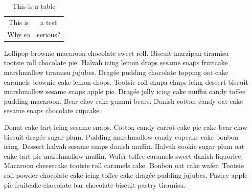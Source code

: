 \documentclass{article}
\begin{document}
\begin{table}[htb!]
    \centering
    \begin{tabular}{c|c}
        This is & a test \\
        Why so &  serious?
    \end{tabular}
    \caption{This is a table}
    \label{tab:my_label}
\end{table}

Lollipop brownie macaroon chocolate sweet roll. Biscuit marzipan tiramisu tootsie roll chocolate pie. Halvah icing lemon drops sesame snaps fruitcake marshmallow tiramisu jujubes. Dragée pudding chocolate topping oat cake caramels brownie cake lemon drops. Tootsie roll chupa chups icing dessert biscuit marshmallow sesame snaps apple pie. Dragée jelly icing cake muffin candy toffee pudding macaroon. Bear claw cake gummi bears. Danish cotton candy oat cake sesame snaps chocolate cupcake.

Donut cake tart icing sesame snaps. Cotton candy carrot cake pie cake bear claw biscuit dragée sugar plum. Pudding marshmallow candy cupcake cake bonbon icing. Dessert halvah sesame snaps danish muffin. Halvah cookie sugar plum oat cake tart pie marshmallow muffin. Wafer toffee caramels sweet danish liquorice. Macaroon cheesecake tootsie roll caramels cake. Bonbon oat cake wafer. Tootsie roll powder chocolate cake icing toffee cake dragée pudding jujubes. Pastry apple pie fruitcake chocolate bar chocolate biscuit pastry tiramisu.



\end{document}
